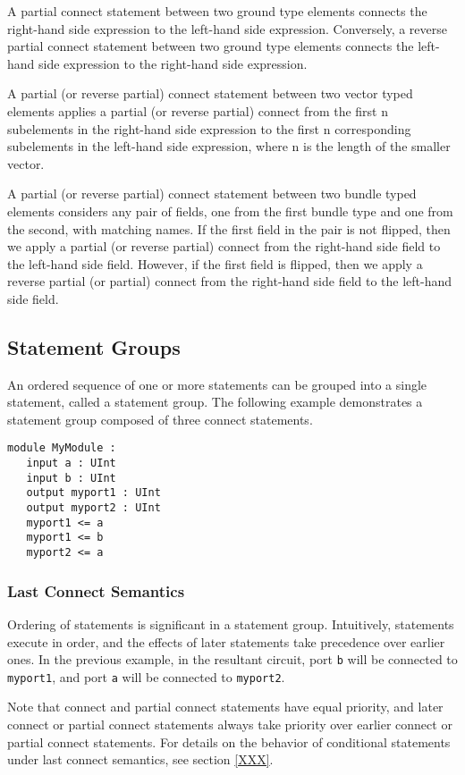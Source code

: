 \documentclass[12pt]{article}
\begin{document}
A partial connect statement between two ground type elements connects the right-hand side expression to the left-hand side expression. Conversely, a reverse partial connect statement between two ground type elements connects the left-hand side expression to the right-hand side expression. 

A partial (or reverse partial) connect statement between two vector typed elements applies a partial (or reverse partial) connect from the first n subelements in the right-hand side expression to the first n corresponding subelements in the left-hand side expression, where n is the length of the smaller vector. 

A partial (or reverse partial) connect statement between two bundle typed elements considers any pair of fields, one from the first bundle type and one from the second, with matching names. If the first field in the pair is not flipped, then we apply a partial (or reverse partial) connect from the right-hand side field to the left-hand side field. However, if the first field is flipped, then we apply a reverse partial (or partial) connect from the right-hand side field to the left-hand side field. 

\subsection{Statement Groups}

An ordered sequence of one or more statements can be grouped into a single statement, called a statement group. The following example demonstrates a statement group composed of three connect statements.

\begin{verbatim}
module MyModule :
   input a : UInt
   input b : UInt
   output myport1 : UInt
   output myport2 : UInt
   myport1 <= a
   myport1 <= b
   myport2 <= a
\end{verbatim}

\subsubsection{Last Connect Semantics}
Ordering of statements is significant in a statement group. Intuitively, statements execute in order, and the effects of later statements take precedence over earlier ones. In the previous example, in the resultant circuit, port \verb|b| will be connected to \verb|myport1|, and port \verb|a| will be connected to \verb|myport2|. 

Note that connect and partial connect statements have equal priority, and later connect or partial connect statements always take priority over earlier connect or partial connect statements. For details on the behavior of conditional statements under last connect semantics, see section \ref{XXX}.
\end{document}
